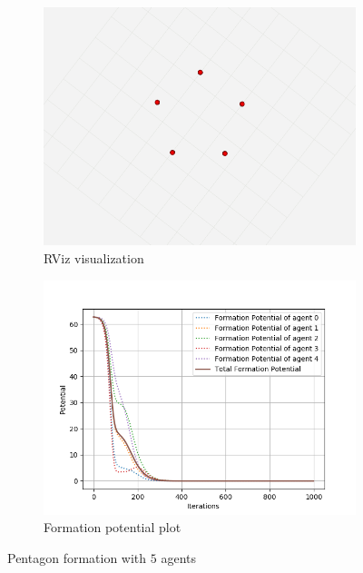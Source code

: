 \documentclass[a4paper,11pt,oneside]{book}
\begin{document}
\begin{figure}[h]
\centering
	\begin{subfigure}{0.49\textwidth}	
	\includegraphics[scale=0.24]{pentagon_rviz}
	\caption{RViz visualization}
	\end{subfigure}
\hfill
	\begin{subfigure}{0.49\textwidth}	
	\includegraphics[scale=0.42]{Formation_potential_pentagon}
	\caption{Formation potential plot}
	\end{subfigure}
\caption{Pentagon formation with $5$ agents}
\label{Pentagon}
\end{figure}
\end{document}
